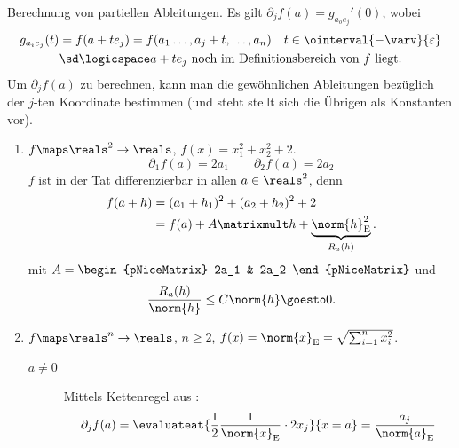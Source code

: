 \begin{bemerkung}
    Berechnung von partiellen Ableitungen. Es gilt \( \partial_j f(a)=g_{a_o e_j}'(0) \), wobei
    \begin{multline*}
        g_{a_i e_j}(t)=f(a+t e_j)=f(a_1\dotsc, a_j+t, \dotsc,a_n)\quad t\in \ointerval{-\varv}{\varepsilon} \\\text{\sd} \logicspace  a+te_{j} \ \text{noch im Definitionsbereich von \( f \) liegt.}
    \end{multline*}
    \timplies Um \( \partial_j f(a) \) zu berechnen, kann man die gewöhnlichen Ableitungen bezüglich der \( j \)-ten Koordinate bestimmen (und steht stellt sich die Übrigen als Konstanten vor).
\end{bemerkung}
\begin{beispiele}
    \begin{enumerate}
        \item \( f\maps \reals^2\to \reals \), \( f(x)=x_1^2+x_2^2+2 \).
        \begin{equation*}
            \partial_1 f(a)=2a_1\qquad \partial_2 f(a)=2a_2
        \end{equation*}
        \( f \) ist in der Tat differenzierbar in allen \( a\in \reals^2 \), denn
        \begin{equation*}
            \begin{split}
                f(a+h)&=(a_1+h_1)^2+(a_2+h_2)^2+2\\
                &=f(a)+A\matrixmult h+\underbrace{\norm{h}_{\text{E}}^2}_{R_a(h)}.
            \end{split}
        \end{equation*}
        mit \( A=\begin{pNiceMatrix} 2a_1 & 2a_2 \end{pNiceMatrix} \) und
        \begin{align*}
            \frac{R_a(h)}{\norm{h}}\leq C\norm{h}\goesto 0.
        \end{align*}
        \item \( f\maps \reals^n \to \reals\), \( n\geq 2 \), \( f(x)=\norm{x}_{\text{E}}=\sqrt{\sum_{i=1}^{n}x_i^2} \).
        \begin{description}
            \item[\( a\neq 0 \)] Mittels Kettenregel aus :
            \begin{align*}
                \partial_j f(a)=\evaluateat{\frac{1}{2}\frac{1}{\norm{x}_{\text{E}}}\cdot 2x_j}{x=a}=\frac{a_j}{\norm{a}_{\text{E}}}
            \end{align*}

\end{description}
\end{enumerate}
\end{beispiele}
